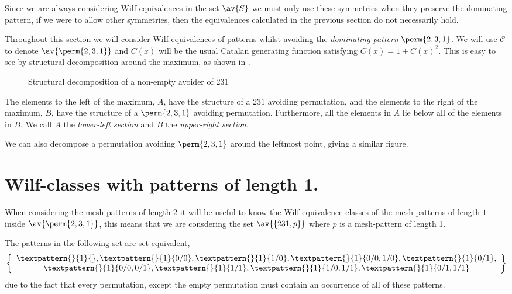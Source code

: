 Since we are always considering Wilf-equivalences in the set \(\av{S}\) we
must only use these symmetries when they preserve the dominating pattern, if we
were to allow other symmetries, then the equivalences calculated in the previous
section do not necessarily hold.

Throughout this section we will consider Wilf-equivalences of patterns
whilst avoiding the \emph{dominating pattern} \(\perm{2,3,1}\). We will
use \(\mathcal{C}\) to denote \(\av{\perm{2,3,1}}\) and \(C(x)\) will
be the usual Catalan generating function satisfying \(C(x) = 1 + C(x)^2\).
This is easy to see by structural decomposition around the maximum, as
shown in .

\begin{figure}[!ht]
    \centering
    \caption{Structural decomposition of a non-empty avoider of 231}
    \label{fig:decompmax}
\end{figure}

The elements to the left of the maximum, \(A\), have the structure of a \(231\)
avoiding permutation, and the elements to the right of the maximum, \(B\), have the
structure of a \(\perm{2,3,1}\) avoiding permutation. Furthermore, all the
elements in \(A\) lie below all of the elements in \(B\). We call \(A\) the
\emph{lower-left section} and \(B\) the \emph{upper-right section}.

We can also decompose a permutation avoiding \(\perm{2,3,1}\) around the leftmost
point, giving a similar figure.

\section{Wilf-classes with patterns of length 1.}
When considering the mesh patterns of length \(2\) it will be useful to know
the Wilf-equivalence classes of the mesh patterns of length \(1\) inside
\(\av{\perm{2,3,1}}\), this means that we are consdering the set \(\av{\{231,p\}}\)
where \(p\) is a mesh-pattern of length 1.

The patterns in the following set are set equivalent,
\begin{equation*}
    \left\{
        \begin{array}{c}
        \textpattern{}{1}{},
        \textpattern{}{1}{0/0},
        \textpattern{}{1}{1/0},
        \textpattern{}{1}{0/0,1/0},
        \textpattern{}{1}{0/1},\\
        \textpattern{}{1}{0/0,0/1},
        \textpattern{}{1}{1/1},
        \textpattern{}{1}{1/0,1/1},
        \textpattern{}{1}{0/1,1/1}
    \end{array}
    \right\}
\end{equation*}
due to the fact that every permutation, except the empty
permutation must contain an occurrence of all of these patterns.

